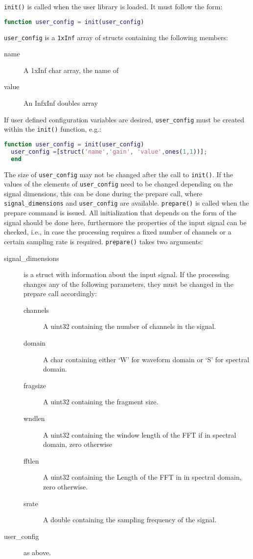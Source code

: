 \documentclass[11pt,a4paper,twoside]{article}
\newcommand{\+}{\discretionary{\mbox{\scriptsize$\hookleftarrow$}}{}{}}
\begin{document}
\texttt{init()} is called when the user library is loaded. It must follow the form:
\begin{lstlisting}[language=Matlab]
  function user_config = init(user_config)
\end{lstlisting}
\texttt{user\_config} is a \texttt{1xInf} array of structs containing the following members:
\begin{description}
\item[name] A 1xInf char array, the name of 
\item[value] An InfxInf doubles array
\end{description}
If user defined configuration variables are desired, \texttt{user\_config} must
be created within the \texttt{init()} function, e.g.:
\begin{lstlisting}[language=Matlab]
  function user_config = init(user_config)
  user_config =[struct('name','gain', 'value',ones(1,1))];
  end
\end{lstlisting}
The size of \texttt{user\_config} may not be changed after the call to \texttt{init()}. If the values of the
elements of \texttt{user\_config} need to be changed depending on the signal dimensions,
this can be done during the prepare call, where \texttt{signal\_dimensions} and \texttt{user\_config} are available.
\texttt{prepare()} is called when the prepare command is issued. All
initialization that depends on the form of the signal should be done here,
furthermore the properties of the input signal can be checked, i.e., in case the 
processing requires a fixed number of channels or a certain sampling rate is required.
\texttt{prepare()} takes two arguments:
  \begin{description}
  \item[signal\_dimensions] is a struct with information about the input signal.
    If the processing changes any of the following parameters,
    they must be changed in the prepare call accordingly:
    \begin{description}
    \item[channels] A uint32 containing the number of channels in the signal.
    \item[domain] A char containing either `W' for waveform domain or `S' for spectral domain. 
    \item[fragsize] A uint32 containing the fragment size.
    \item[wndlen] A uint32 containing the window length of the FFT if in spectral domain, zero otherwise
    \item[fftlen] A uint32 containing the Length of the FFT in in spectral domain, zero otherwise.
    \item[srate] A double containing the sampling frequency of the signal.
    \end{description}
  \item[user\_config] as above.
  \end{description}
\end{document}
